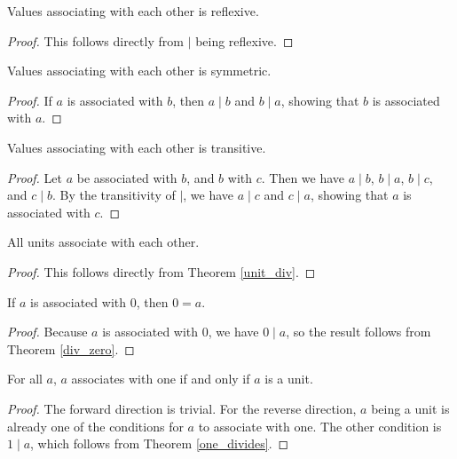 \documentclass[../../math.tex]{subfiles}
\begin{document}
\begin{instance}
    Values associating with each other is reflexive.
\end{instance}
\begin{proof}
    This follows directly from $\mid$ being reflexive.
\end{proof}

\begin{instance}
    Values associating with each other is symmetric.
\end{instance}
\begin{proof}
    If $a$ is associated with $b$, then $a \mid b$ and $b \mid a$, showing that
    $b$ is associated with $a$.
\end{proof}

\begin{instance}
    Values associating with each other is transitive.
\end{instance}
\begin{proof}
    Let $a$ be associated with $b$, and $b$ with $c$.  Then we have $a \mid b$,
    $b \mid a$, $b \mid c$, and $c \mid b$.  By the transitivity of $\mid$, we
    have $a \mid c$ and $c \mid a$, showing that $a$ is associated with $c$.
\end{proof}

\begin{theorem} \label{unit_associates}
    All units associate with each other.
\end{theorem}
\begin{proof}
    This follows directly from Theorem \ref{unit_div}.
\end{proof}

\begin{theorem} \label{associates_zero}
    If $a$ is associated with $0$, then $0 = a$.
\end{theorem}
\begin{proof}
    Because $a$ is associated with $0$, we have $0 \mid a$, so the result
    follows from Theorem \ref{div_zero}.
\end{proof}

\begin{theorem} \label{associates_one}
    For all $a$, $a$ associates with one if and only if $a$ is a unit.
\end{theorem}
\begin{proof}
    The forward direction is trivial.  For the reverse direction, $a$ being a
    unit is already one of the conditions for $a$ to associate with one.  The
    other condition is $1 \mid a$, which follows from Theorem \ref{one_divides}.
\end{proof}
\end{document}
